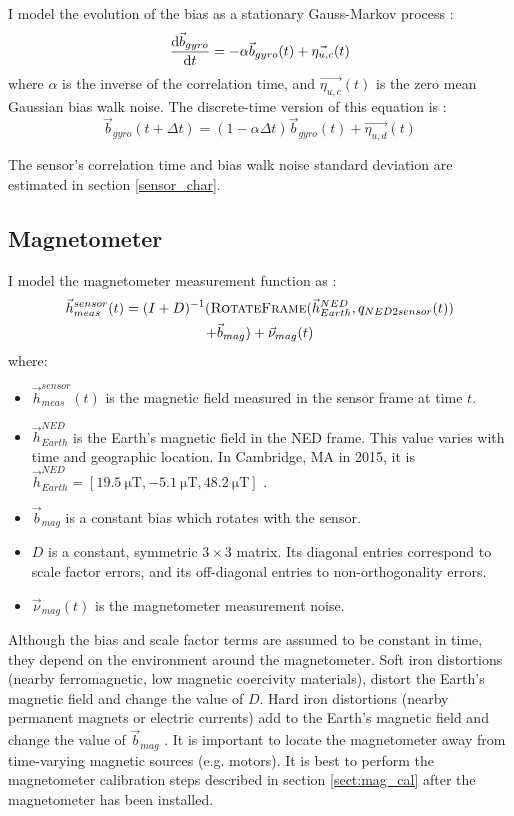 \documentclass[conference]{IEEEtran}
\begin{document}
I model the evolution of the bias as a stationary Gauss-Markov process \cite{1642588, park}:
\begin{equation}
  \dv{\vec{b}_{gyro}}{t} = - \alpha \vec{b}_{gyro}(t) + \vec{\eta_{u,c}}(t)
\end{equation}
where $\alpha$ is the inverse of the correlation time, and $\vec{\eta_{u,c}}(t)$ is the zero mean Gaussian bias walk noise. The discrete-time version of this equation is \cite{1642588}:
\begin{equation}
  \vec{b}_{gyro}(t + \Delta t) = (1 - \alpha \Delta t) \vec{b}_{gyro}(t) + \vec{\eta_{u,d}}(t)
\end{equation}

The sensor's correlation time and bias walk noise standard deviation are estimated in section \ref{sensor_char}.


\subsection{Magnetometer}
I model the magnetometer measurement function as \cite{Crassidis2005}:
\begin{multline}
  \vec{h}_{meas}^{sensor}(t) = (I + D)^{-1}(\textproc{RotateFrame}(\vec{h}_{Earth}^{NED}, q_{NED2sensor}(t)) \\
  + \vec{b}_{mag}) + \vec{\nu}_{mag}(t)
\end{multline}
where:
\begin{itemize}
  \item $\vec{h}_{meas}^{sensor}(t)$ is the magnetic field measured in the sensor frame at time $t$.
  \item $\vec{h}_{Earth}^{NED}$ is the Earth's magnetic field in the NED frame. This value varies with time and geographic location. In Cambridge, MA in 2015, it is $\vec{h}_{Earth}^{NED} = [\SI{19.5}{\micro\tesla}, \SI{-5.1}{\micro\tesla}, \SI{48.2}{\micro\tesla}]$ \cite{wmm}.
  \item $\vec{b}_{mag}$ is a constant bias which rotates with the sensor.
  \item $D$ is a constant, symmetric $3\times3$ matrix. Its diagonal entries correspond to scale factor errors, and its off-diagonal entries to non-orthogonality errors.
  \item $\vec{\nu}_{mag}(t)$ is the magnetometer measurement noise.
\end{itemize}

Although the bias and scale factor terms are assumed to be constant in time, they depend on the environment around the magnetometer. Soft iron distortions (nearby ferromagnetic, low magnetic coercivity materials), distort the Earth's magnetic field and change the value of $D$. Hard iron distortions (nearby permanent magnets or electric currents) add to the Earth's magnetic field and change the value of $\vec{b}_{mag}$ \cite{hardsoftiron}. It is important to locate the magnetometer away from time-varying magnetic sources (e.g. motors). It is best to perform the magnetometer calibration steps described in section \ref{sect:mag_cal} after the magnetometer has been installed. 
\end{document}
